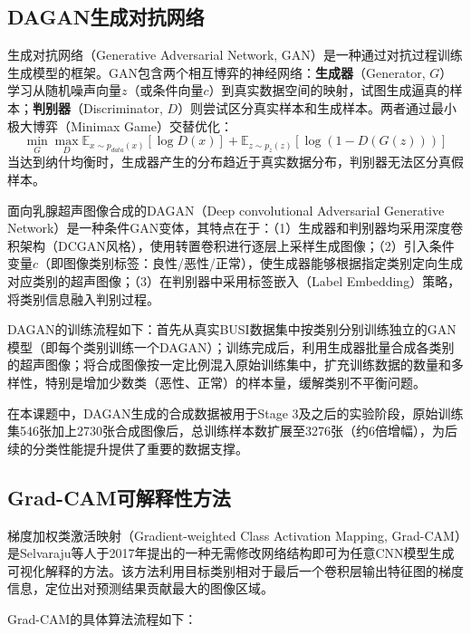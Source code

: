 \subsection{DAGAN生成对抗网络}

生成对抗网络（Generative Adversarial Network, GAN）\cite{goodfellow2014generative}是一种通过对抗过程训练生成模型的框架。GAN包含两个相互博弈的神经网络：\textbf{生成器}（Generator, $G$）学习从随机噪声向量$z$（或条件向量$c$）到真实数据空间的映射，试图生成逼真的样本；\textbf{判别器}（Discriminator, $D$）则尝试区分真实样本和生成样本。两者通过最小极大博弈（Minimax Game）交替优化：
\begin{equation}
    \label{eq:gan}
    \min_G \max_D \mathbb{E}_{x \sim p_{data}(x)}[\log D(x)] + \mathbb{E}_{z \sim p_z(z)}[\log(1 - D(G(z)))]
\end{equation}
当达到纳什均衡时，生成器产生的分布趋近于真实数据分布，判别器无法区分真假样本。

面向乳腺超声图像合成的DAGAN（Deep convolutional Adversarial Generative Network）\cite{aldhabyani2020dataset}是一种条件GAN变体，其特点在于：（1）生成器和判别器均采用深度卷积架构（DCGAN风格），使用转置卷积进行逐层上采样生成图像；（2）引入条件变量$c$（即图像类别标签：良性/恶性/正常），使生成器能够根据指定类别定向生成对应类别的超声图像；（3）在判别器中采用标签嵌入（Label Embedding）策略，将类别信息融入判别过程。

DAGAN的训练流程如下：首先从真实BUSI数据集中按类别分别训练独立的GAN模型（即每个类别训练一个DAGAN）；训练完成后，利用生成器批量合成各类别的超声图像；将合成图像按一定比例混入原始训练集中，扩充训练数据的数量和多样性，特别是增加少数类（恶性、正常）的样本量，缓解类别不平衡问题。

在本课题中，DAGAN生成的合成数据被用于Stage 3及之后的实验阶段，原始训练集546张加上2730张合成图像后，总训练样本数扩展至3276张（约6倍增幅），为后续的分类性能提升提供了重要的数据支撑。


\subsection{Grad-CAM可解释性方法}
\label{sec:gradcam}

梯度加权类激活映射（Gradient-weighted Class Activation Mapping, Grad-CAM）\cite{selvaraju2017grad}是Selvaraju等人于2017年提出的一种无需修改网络结构即可为任意CNN模型生成可视化解释的方法。该方法利用目标类别相对于最后一个卷积层输出特征图的梯度信息，定位出对预测结果贡献最大的图像区域。

Grad-CAM的具体算法流程如下：

